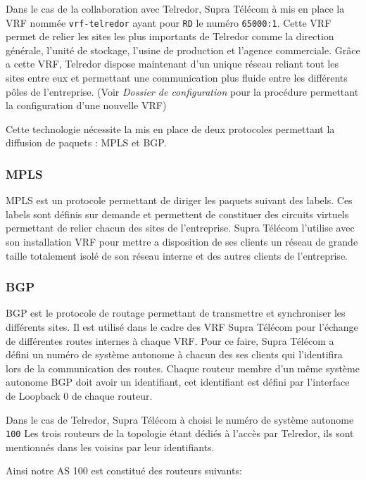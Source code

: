 \documentclass{article}
\newcommand{\tlr}{Telredor\xspace}
\newcommand{\spr}{Supra Télécom\xspace}
\begin{document}
Dans le cas de la collaboration avec \tlr, \spr à mis en place la VRF nommée \texttt{vrf-telredor} ayant pour \texttt{RD} le numéro \texttt{65000:1}.
Cette VRF permet de relier les sites les plus importants de \tlr comme la direction générale, l'unité de stockage, l'usine de production et l'agence commerciale.
Grâce a cette VRF, \tlr dispose maintenant d'un unique réseau reliant tout les sites entre eux et permettant une communication plus fluide entre les différents pôles de l'entreprise. (Voir \emph{Dossier de configuration} pour la procédure permettant la configuration d'une nouvelle VRF)

Cette technologie nécessite la mis en place de deux protocoles permettant la diffusion de paquets : MPLS et BGP.

\subsubsection{MPLS}

MPLS est un protocole permettant de diriger les paquets suivant des labels.
Ces labels sont définis sur demande et permettent de constituer des circuits virtuels permettant de relier chacun des sites de l'entreprise.
\spr l'utilise avec son installation VRF pour mettre a disposition de ses clients un réseau de grande taille totalement isolé de son réseau interne et des autres clients de l'entreprise.

\subsubsection{BGP}

BGP est le protocole de routage permettant de transmettre et synchroniser les différents sites.
Il est utilisé dans le cadre des VRF \spr pour l'échange de différentes routes internes à chaque VRF.
Pour ce faire, \spr a défini un numéro de système autonome à chacun des ses clients qui l'identifira lors de la communication des routes.
Chaque routeur membre d'un même système autonome BGP doit avoir un identifiant, cet identifiant est défini par l'interface de Loopback 0 de chaque routeur.

Dans le cas de \tlr, \spr à choisi le numéro de système autonome \texttt{100}
Les trois routeurs de la topologie étant dédiés à l'accès par \tlr, ils sont mentionnés dans les voisins par leur identifiants.

Ainsi notre AS 100 est constitué des routeurs suivants:

\bigskip
\end{document}
